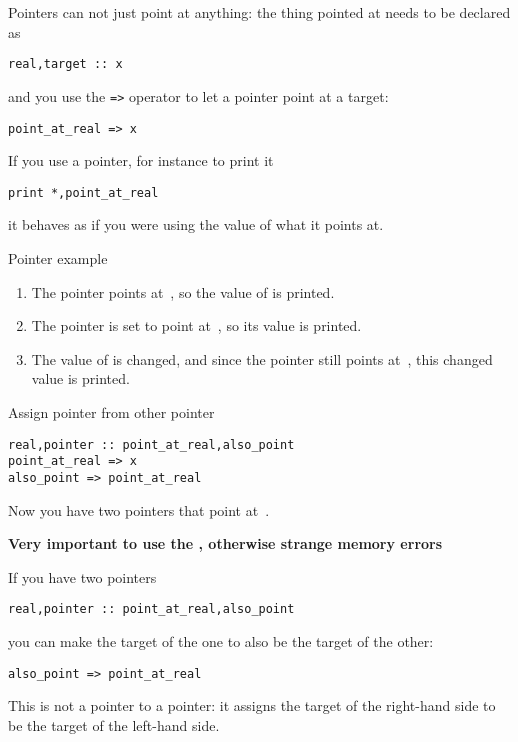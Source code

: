 Pointers can not just point at anything: the thing pointed at needs to
be declared as 
\begin{lstlisting}
real,target :: x
\end{lstlisting}
and you use the \verb+=>+ operator to let a pointer point at a target:
\begin{lstlisting}
point_at_real => x
\end{lstlisting}

If you use a pointer, for instance to print it
\begin{lstlisting}
print *,point_at_real
\end{lstlisting}
it behaves as if you were using the value of what it points at.

\begin{block}{Pointer example}
  \label{sl:fpoint-ex}
  \begin{enumerate}
  \item The pointer points at~, so the value of  is printed.
  \item The pointer is set to point at~, so its value is printed.
  \item The value of  is changed, and since the pointer still
    points at~, this changed value is printed.
  \end{enumerate}
\end{block}

\begin{block}{Assign pointer from other pointer}
  \label{sl:fpoint-copy}
\begin{lstlisting}
real,pointer :: point_at_real,also_point
point_at_real => x
also_point => point_at_real  
\end{lstlisting}
  Now you have two pointers that point at~.

  \textbf{Very important to use the \n{=>}, otherwise strange
    memory errors}
\end{block}

If you have two pointers
\begin{lstlisting}
real,pointer :: point_at_real,also_point
\end{lstlisting}
you can make the target of the one to also be the target of the other:
\begin{lstlisting}
also_point => point_at_real  
\end{lstlisting}
This is not a pointer to a pointer: it assigns the target of the
right-hand side to be the target of the left-hand side.

